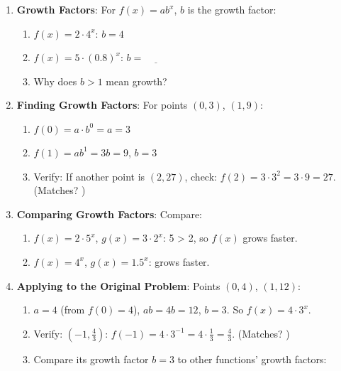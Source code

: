 \documentclass[12pt]{article}
\begin{document}
\begin{enumerate}[label=30.\arabic*]
    \item \textbf{Growth Factors}: For \( f(x) = ab^x \), \( b \) is the growth factor:
    \begin{enumerate}[label=\alph*)]
        \item \( f(x) = 2 \cdot 4^x \): \( b = 4 \)
        \item \( f(x) = 5 \cdot (0.8)^x \): \( b = \underline{\hspace{1cm}} \)
        \item Why does \( b > 1 \) mean growth? \underline{\hspace{6cm}}
    \end{enumerate}
    \item \textbf{Finding Growth Factors}: For points \((0, 3)\), \((1, 9)\):
    \begin{enumerate}[label=\alph*)]
        \item \( f(0) = a \cdot b^0 = a = 3 \)
        \item \( f(1) = ab^1 = 3b = 9 \), \( b = 3 \)
        \item Verify: If another point is \((2, 27)\), check: \(f(2) = 3 \cdot 3^2 = 3 \cdot 9 = 27 \). (Matches? \underline{\hspace{0.5cm}})
    \end{enumerate}
    \item \textbf{Comparing Growth Factors}: Compare:
    \begin{enumerate}[label=\alph*)]
        \item \( f(x) = 2 \cdot 5^x \), \( g(x) = 3 \cdot 2^x \): 5 > 2, so \( f(x) \) grows faster.
        \item \( f(x) = 4^x \), \( g(x) = 1.5^x \): \underline{\hspace{1.5cm}} grows faster.
    \end{enumerate}
    \item \textbf{Applying to the Original Problem}: Points \((0, 4)\), \((1, 12)\):
    \begin{enumerate}[label=\alph*)]
        \item \( a = 4 \) (from \(f(0)=4\)), \( ab = 4b = 12 \), \( b = 3 \). So \(f(x) = 4 \cdot 3^x\).
        \item Verify: \((-1, \frac{4}{3})\): \( f(-1) = 4 \cdot 3^{-1} = 4 \cdot \frac{1}{3} = \frac{4}{3} \). (Matches? \underline{\hspace{0.5cm}})
        \item Compare its growth factor \(b=3\) to other functions' growth factors:

\end{enumerate}
\end{enumerate}
\end{document}
